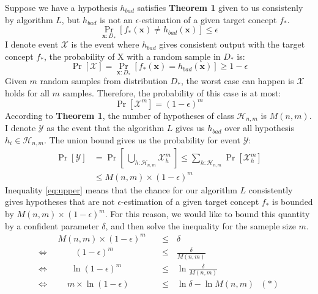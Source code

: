 \documentclass[a4paper,12pt]{article}
\begin{document}
Suppose we have a hypothesis $h_{bad}$ satisfies \textbf{Theorem 1} given to us consistenly by algorithm $L$, but $h_{bad}$ is not an $\epsilon$-estimation of a given target concept $f_*$. 
\begin{equation*}
    \Pr_{\boldsymbol{x}:D_*} [f_*(\boldsymbol{x}) \neq h_{bad}(\boldsymbol{x})] \leq \epsilon
\end{equation*}
I denote event $\mathcal{X}$ is the event where $h_{bad}$ gives consistent output with the target concept $f_*$, the probability of X with a random sample in $D_*$ is:
\begin{equation*}
    \Pr[\mathcal{X}] = \Pr_{\boldsymbol{x}:D_*} [f_*(\boldsymbol{x}) = h_{bad}(\boldsymbol{x})] \geq 1 - \epsilon
\end{equation*}
Given $m$ random samples from distribution $D_*$, the worst case can happen is $\mathcal{X}$ holds for all $m$ samples. Therefore, the probability of this case is at most:
\begin{equation*}
    \Pr[\mathcal{X}^m] = (1 - \epsilon)^m
\end{equation*}
According to \textbf{Theorem 1}, the number of hypotheses of class $\mathcal{H}_{n,m}$ is $M(n,m)$. I denote $\mathcal{Y}$ as the event that the algorithm $L$ gives us $h_{bad}$ over all hypothesis $h_i \in \mathcal{H}_{n,m}$. The union bound gives us the probability for event $\mathcal{Y}$:
\begin{equation} \label{eq:upper}
    \begin{aligned}
        \Pr[\mathcal{Y}] & = \Pr \left [\ \bigcup_{h:\mathcal{H}_{n,m}}\mathcal{X}^m_h\ \right ]
        \leq \sum_{h:\mathcal{H}_{n,m}} \Pr[\mathcal{X}^{m}_h] \\
        & \leq M(n,m) \times (1-\epsilon)^m
    \end{aligned}
\end{equation}
\noindent
Inequality \eqref{eq:upper} means that the chance for our algorithm $L$ consistently gives hypotheses that are not $\epsilon$-estimation of a given target concept $f_*$ is bounded by $M(n,m) \times (1-\epsilon)^m$. For this reason, we would like to bound this quantity by a confident parameter $\delta$, and then solve the inequality for the sameple size $m$.
\begin{equation*}
    \begin{aligned}
        & M(n,m) \times (1-\epsilon)^m && \leq \ \ \ \delta \\
        \Leftrightarrow \ \ &\ \ \ \ \ \ \ \ \ (1-\epsilon)^m && \leq \ \ \ \frac{\delta}{M(n,m)}\\
        \Leftrightarrow \ \ &\ \ \ \ \ \ \ \ln(1-\epsilon)^m && \leq \ \ \ \ln\frac{\delta}{M(n,m)}\\
        \Leftrightarrow \ \ &\ \ \ \ \ m \times \ln(1-\epsilon) && \leq \ \ \ \ln \delta - \ln M(n,m) \ \ \ (\boldsymbol{\ast})
    \end{aligned}
\end{equation*}
\end{document}
